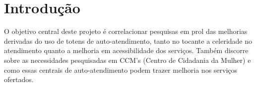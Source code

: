 \section{Introdução}
\vspace*{1cm}
O objetivo central deste projeto é correlacionar pesquisas em prol das melhorias derivadas do uso de totens de auto-atendimento, tanto no tocante a celeridade no atendimento quanto a melhoria em acessibilidade dos serviços. Também discorre sobre as necessidades pesquisadas em CCM's (Centro de Cidadania da Mulher) e como essas centrais de auto-atendimento podem trazer melhoria nos serviços ofertados.
\newpage

